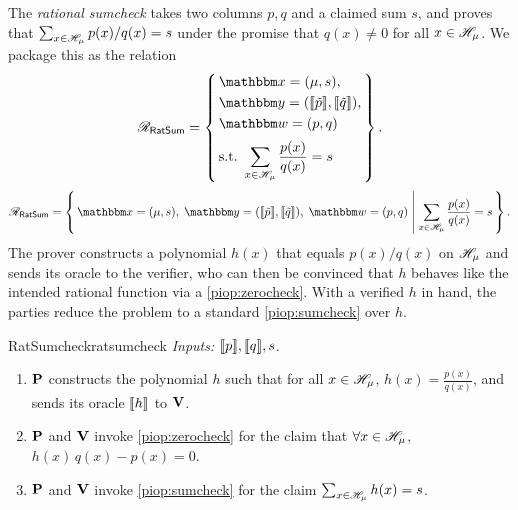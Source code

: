 The \emph{rational sumcheck} takes two columns $p,q$ and a claimed sum $s$, and proves that $\sum_{x \in \mathscr{H}_{\mu}} p(x)/q(x) = s$ under the promise that $q(x) \neq 0$ for all $x \in \mathscr{H}_{\mu}$. We package this as the relation
\ifsp
\begin{displaymath}
\NPRelation_{\mathsf{RatSum}} = \left\{\,
  \begin{aligned}
    & \NPInstance = (\mu, s),\\
    & \NPInstancey = (\Oracle{\MLE{p}}, \Oracle{\MLE{q}}),\\
    & \NPWitness = (p, q)\\[2pt]
    & \text{s.t.}\ \sum_{x \in \BoolHCube{\mu}} \frac{p(x)}{q(x)} = s
  \end{aligned}
\,\right\}.
\end{displaymath}
\else
\begin{displaymath}
\NPRelation_{\mathsf{RatSum}} = \left\{\,
  \NPInstance = (\mu, s),\;
  \NPInstancey = (\Oracle{\MLE{p}}, \Oracle{\MLE{q}}),\;
  \NPWitness = (p, q)
  \;\middle|\;
    \sum_{x \in \BoolHCube{\mu}} \frac{p(x)}{q(x)} = s
\,\right\}.
\end{displaymath}
\fi
The prover constructs a polynomial $h(x)$ that equals $p(x)/q(x)$ on $\mathscr{H}_{\mu}$ and sends its oracle to the verifier, who can then be convinced that $h$ behaves like the intended rational function via a \cref{piop:zerocheck}. With a verified $h$ in hand, the parties reduce the problem to a standard \cref{piop:sumcheck} over $h$.
\begin{DefinePIOP}{RatSumcheck}{ratsumcheck}
  \emph{Inputs:} $\llbracket p\rrbracket, \llbracket q\rrbracket, s$.
  \begin{enumerate}[nosep]
    \item $\bf{P}$ constructs the polynomial $h$ such that for all $x \in \mathscr{H}_{\mu}$, $h(x) = \frac{p(x)}{q(x)}$, and sends its oracle $\llbracket h\rrbracket$ to $\bf{V}$.
    \item $\bf{P}$ and $\bf{V}$ invoke \cref{piop:zerocheck} for the claim that $\forall x \in \mathscr{H}_{\mu}$, $h(x)\,q(x) - p(x) = 0$.
    \item $\bf{P}$ and $\bf{V}$ invoke \cref{piop:sumcheck} for the claim $\sum_{x\in\mathscr{H}_{\mu}}h(x) = s$.
  \end{enumerate}
\end{DefinePIOP}
